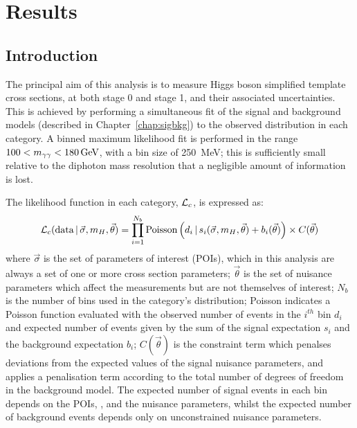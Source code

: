\chapter{Results}
\label{chap:results}

\section{Introduction}

The principal aim of this analysis is to measure Higgs boson simplified template cross sections, 
at both stage 0 and stage 1, and their associated uncertainties.
This is achieved by performing a simultaneous fit of the signal and background models 
(described in Chapter~\ref{chap:sigbkg}) to the observed \mgg distribution in each category.
A binned maximum likelihood fit is performed in the range $100 < m_{\gamma\gamma} < \SI{180}{GeV}$, 
with a bin size of \SI{250}{MeV};
this is sufficiently small relative to the diphoton mass resolution 
that a negligible amount of information is lost. %

The likelihood function in each category, $\mathcal{L}_c$, is expressed as:
\begin{equation}
\mathcal{L}_c(\textrm{data}\,|\,\vec{\sigma},m_{H},\vec{\theta}) = \prod^{N_b}_{i=1} \textrm{Poisson}\left( d_i\,|\, 
                  s_i(\vec{\sigma},m_{H},\vec{\theta}) + b_i(\vec{\theta}) \right) \times C(\vec{\theta})
\end{equation}
where $\vec{\sigma}$ is the set of parameters of interest (POIs), 
which in this analysis are always a set of one or more cross section parameters;
$\vec{\theta}$ is the set of nuisance parameters which affect the measurements 
but are not themselves of interest;
$N_b$ is the number of bins used in the category's \mgg distribution;
Poisson indicates a Poisson function evaluated with the observed number of events 
in the $i^{\mathit{th}}$ bin $d_i$ 
and expected number of events given by the sum of the signal expectation $s_i$ 
and the background expectation $b_i$;
$C(\vec{\theta})$ is the constraint term which penalses deviations 
from the expected values of the signal nuisance parameters,
and applies a penalisation term according to 
the total number of degrees of freedom in the background model.
The expected number of signal events in each bin depends on the POIs, \mH, 
and the nuisance parameters, 
whilst the expected number of background events depends only on unconstrained nuisance parameters.

